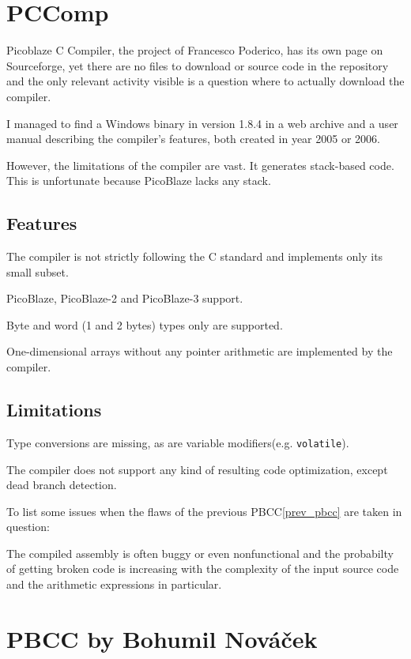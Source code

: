     \section{PCComp}\label{pccomp}

    Picoblaze C Compiler, the project of Francesco Poderico, has its own page on Sourceforge, 
    yet there are no files to download or source code in the repository and the only relevant activity visible is a question where to actually download the compiler.

    I managed to find a Windows binary in version 1.8.4 in a web archive and a user manual describing the compiler's features, both created in year 2005 or 2006.

    However, the limitations of the compiler are vast. It generates stack-based code. This is unfortunate because PicoBlaze lacks any stack. 

        \subsection{Features}

        The compiler is not strictly following the C standard and implements only its small subset.

        PicoBlaze, PicoBlaze-2 and PicoBlaze-3 support.

        Byte and word (1 and 2 bytes) types only are supported.

        One-dimensional arrays without any pointer arithmetic are implemented by the compiler.

        \subsection{Limitations}

        Type conversions are missing, as are variable modifiers(e.g. \texttt{volatile}). 

        The compiler does not support any kind of resulting code optimization, except dead branch detection.

        To list some issues when the flaws of the previous PBCC\ref{prev_pbcc} are taken in question:

        The compiled assembly is often buggy or even nonfunctional and the probabilty of getting broken code is increasing with the complexity of the input source code and the arithmetic expressions in particular.

    \section{PBCC by Bohumil Nováček}\label{not_quite_c}

